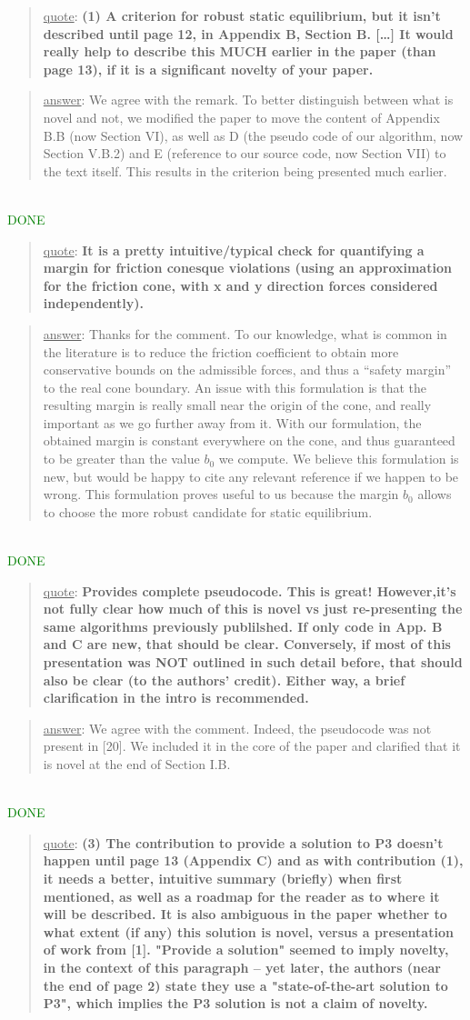 \documentclass[a4paper]{article}
\newcommand{\done}[0]{\textcolor{green}{DONE}}
\newcommand\quot[1]{\begin{quote} \underline{quote}: \textbf{#1}\end{quote}}
\newcommand\as[1]{\begin{quote} \underline{answer}: {#1}\end{quote} \leavevmode \\ }
\begin{document}
\quot { (1) A criterion for robust static equilibrium, but it isn't
described until page 12, in Appendix B, Section B. [\dots]  It would really help to describe this MUCH earlier in
the paper (than page 13), if it is a significant novelty of your paper.}

\as{We agree with the remark. To better distinguish between what is novel and not, we modified the paper to move the content of Appendix B.B (now Section VI), as well as D  (the pseudo code of our algorithm, now Section V.B.2) and E (reference to our source code, now Section VII) to the text itself. This results in the criterion being presented much earlier.}\done

\quot{It is a pretty intuitive/typical check for quantifying a
margin for friction conesque violations (using an approximation for
the friction cone, with x and y direction forces considered
independently). }

\as{Thanks for the comment. To our knowledge, what is common in the literature is to reduce the friction coefficient to obtain more conservative bounds on the admissible forces, and thus a ``safety margin'' to the real cone boundary. An issue with this formulation is that the resulting margin is really small near the origin of the cone, and really important as we go further away from it. With our formulation, the obtained margin is constant everywhere on the cone, and thus guaranteed to be greater than the value $b_0$ we compute. We believe this formulation is new, but would be happy to cite any relevant reference if we happen to be wrong. This formulation proves useful to us because the margin $b_0$ allows to choose the more robust candidate for static equilibrium.}\done

\quot{
Provides complete pseudocode.  This is great! However,it's
not fully clear how much of this is novel vs just re-presenting the
same algorithms previously publilshed.	If only code in App. B and C
are new, that should be clear. Conversely, if most of this presentation
was NOT outlined in such detail before, that should also be clear (to
the authors' credit). Either way, a brief clarification in the intro is
recommended.}

\as{We agree with the comment. Indeed, the pseudocode was not present in [20]. We included it in the core of the paper and clarified that it is novel at the end
of Section I.B.}\done


\quot{(3)	The contribution to provide a solution to P3 doesn't happen
until page 13 (Appendix C) and as with contribution (1), it needs a
better, intuitive summary (briefly) when first mentioned, as well as a
roadmap for the reader as to where it will be described. It is also
ambiguous in the paper whether to what extent (if any) this solution is
novel, versus a presentation of work from [1]. "Provide a solution"
seemed to imply novelty, in the context of this paragraph -- yet later,
the authors (near the end of page 2) state they use a "state-of-the-art
solution to P3", which implies the P3 solution is not a claim of
novelty.}
\end{document}
